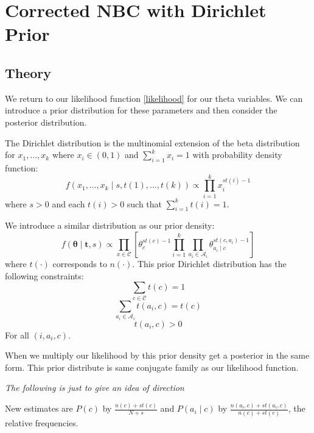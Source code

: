 \chapter{Corrected NBC with Dirichlet Prior}

\section{Theory}

We return to our likelihood function \cref{likelihood} for our theta variables.
We can introduce a prior distribution for these parameters and then consider the posterior distribution.

The Dirichlet distribution is the multinomial extension of the beta distribution for $x_1,\dots,x_k$ where $x_i \in (0,1)$ and $\sum_{i=1}^k x_i = 1$ with probability density function:
\begin{equation} \label{dirichlet_pdf}
	f(x_1,\dots,x_k \mid s, t(1),\dots,t(k)) \propto \prod_{i=1}^k x_i^{st(i) - 1}
\end{equation}
where $s > 0$ and each $t(i)>0$ such that $\sum_{i=1}^{k}t(i) = 1$.

We introduce a similar distribution as our prior density:
\begin{equation} \label{prior}
	f(\mathbf{\theta} \mid \mathbf{t}, s) \propto \prod_{x \in \mathcal{C}} \left[ \theta_c^{st(c) - 1} \prod_{i=1}^k \prod_{a_i \in \mathcal{A}_i} \theta_{a_i \mid c}^{st(c, a_i) - 1} \right]
\end{equation}
where $t(\cdot)$ corresponds to $n(\cdot)$.
This prior Dirichlet distribution \cite{Zaffalon01} has the following constraints:
\begin{equation}
	\sum_{c \in \mathcal{C}} t(c) = 1
\end{equation}
\begin{equation}
	\sum_{a_i \in \mathcal{A}_i} t(a_i, c) = t(c)
\end{equation}
\begin{equation}
	t(a_i, c) > 0
\end{equation}
For all $(i, a_i, c)$.

When we multiply our likelihood by this prior density get a posterior in the same form.
This prior distribute is same conjugate family as our likelihood function.

\textit{The following is just to give an idea of direction}

New estimates are $P(c)$ by $\frac{n(c) + st(c)}{N + s}$ and $P(a_i \mid c)$ by $\frac{n(a_i, c) + st(a_i,c)}{n(c)+st(c)}$, the relative frequencies.

